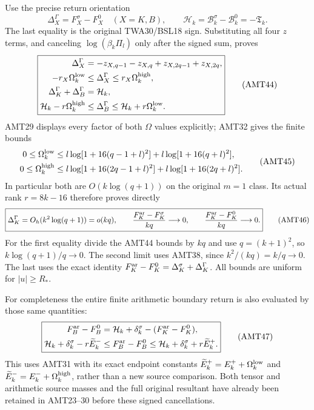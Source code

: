 \documentclass[11pt,a4paper]{article}
\begin{document}
Use the precise return orientation
\[
 \Delta_X^\Gamma=F_X^\sigma-F_X^0\quad(X=K,B),\qquad
 \mathcal H_k=\mathcal B_k^\sigma-\mathcal B_k^0=-\mathfrak T_k.
\]
The last equality is the original TWA30/BSL18 sign. Substituting
all four $z$ terms, and canceling $\log(\beta_k\Pi_l)$ only
after the signed sum, proves
\[
\boxed{\begin{aligned}
 \Delta_X^\Gamma
   &=-z_{X,q-1}-z_{X,q}+z_{X,2q-1}+z_{X,2q},\\
 -r_X\Omega_k^{\rm low}
   &\le\Delta_X^\Gamma\le r_X\Omega_k^{\rm high},\\
 \Delta_K^\Gamma+\Delta_B^\Gamma&=\mathcal H_k,\\
 \mathcal H_k-r\Omega_k^{\rm high}
   &\le\Delta_B^\Gamma\le\mathcal H_k+r\Omega_k^{\rm low}.
\end{aligned}}\tag{AMT44}
\]
AMT29 displays every factor of both $\Omega$ values explicitly;
AMT32 gives the finite bounds
\[
\begin{aligned}
 0\le\Omega_k^{\rm low}
 &\le l\log[1+16(q-1+l)^2]+l\log[1+16(q+l)^2],\\
 0\le\Omega_k^{\rm high}
 &\le l\log[1+16(2q-1+l)^2]+l\log[1+16(2q+l)^2].
\end{aligned}\tag{AMT45}
\]
In particular both are $O(k\log(q+1))$ on the original
$m=1$ class. Its actual rank $r=8k-16$ therefore proves directly
\[
 \boxed{\Delta_K^\Gamma=O_h(k^2\log(q+1))=o(kq),\qquad
 \frac{F_K^{\rm ar}-F_K^\sigma}{kq}\longrightarrow0,\qquad
 \frac{F_K^{\rm ar}-F_K^0}{kq}\longrightarrow0.}
 \tag{AMT46}
\]
For the first equality divide the AMT44 bounds by $kq$ and use
$q=(k+1)^2$, so $k\log(q+1)/q\to0$. The second limit uses
AMT38, since $k^2/(kq)=k/q\to0$. The last uses the exact
identity $F_K^{\rm ar}-F_K^0=\Delta_K^\sigma+\Delta_K^\Gamma$.
All bounds are uniform for $|u|\ge R_*$.

For completeness the entire finite arithmetic boundary return is
also evaluated by those same quantities:
\[
\boxed{\begin{aligned}
 F_B^{\rm ar}-F_B^0
   &=\mathcal H_k+\delta_k^\sigma
                         -(F_K^{\rm ar}-F_K^0),\\
 \mathcal H_k+\delta_k^\sigma-r\widetilde E_k^-
   &\le F_B^{\rm ar}-F_B^0
             \le\mathcal H_k+\delta_k^\sigma+r\widetilde E_k^+.
\end{aligned}}\tag{AMT47}
\]
This uses AMT31 with its exact endpoint constants
$\widetilde E_k^+=E_k^++\Omega_k^{\rm low}$ and
$\widetilde E_k^-=E_k^-+\Omega_k^{\rm high}$, rather than a
new source comparison. Both tensor and arithmetic source masses
and the full original resultant have already been retained in
AMT23--30 before these signed cancellations.
\end{document}

